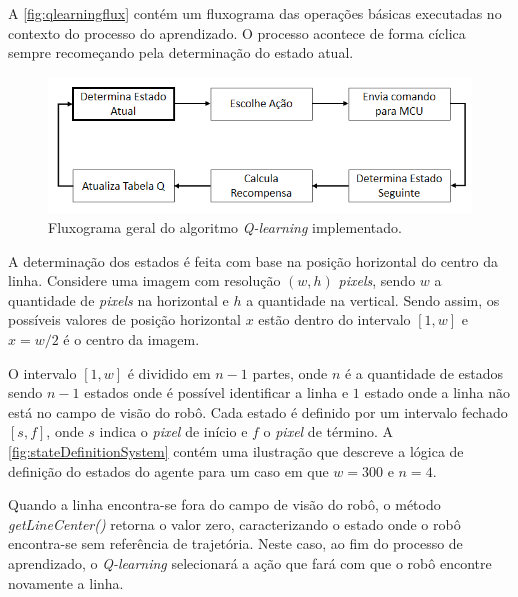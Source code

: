 \documentclass[a4paper]{ifacconf}
\begin{document}
A \autoref{fig:qlearningflux} contém um fluxograma das operações básicas executadas no contexto do processo do aprendizado. O processo acontece de forma cíclica sempre recomeçando pela determinação do estado atual.

\begin{figure}
\centering 
\caption{Fluxograma geral do algoritmo \textit{Q-learning} implementado.} \label{fig:qlearningflux}
\includegraphics[scale=0.51]{Figuras/qlearningflux.png}
\end{figure} 

A determinação dos estados é feita com base na posição horizontal do centro da linha. Considere uma imagem com resolução $(w,h)$ \textit{pixels}, sendo $w$ a quantidade de \textit{pixels} na horizontal e $h$ a quantidade na vertical. Sendo assim, os possíveis valores de posição horizontal $x$ estão dentro do intervalo $[1,w]$ e $x = w/2$ é o centro da imagem. 

O intervalo $[1,w]$ é dividido em $n-1$ partes, onde $n$ é a quantidade de estados sendo $n-1$ estados onde é possível identificar a linha e $1$ estado onde a linha não está no campo de visão do robô. Cada estado é definido por um intervalo fechado $[s,f]$, onde $s$ indica o \textit{pixel} de início e $f$ o \textit{pixel} de término. A \autoref{fig:stateDefinitionSystem} contém uma ilustração que descreve a lógica de definição do estados do agente para um caso em que $w = 300$ e $n = 4$. 

Quando a linha encontra-se fora do campo de visão do robô, o método \textit{getLineCenter()} retorna o valor zero, caracterizando o estado onde o robô encontra-se sem referência de trajetória. Neste caso, ao fim do processo de aprendizado, o \textit{Q-learning} selecionará a ação que fará com que o robô encontre novamente a linha. 
\end{document}
